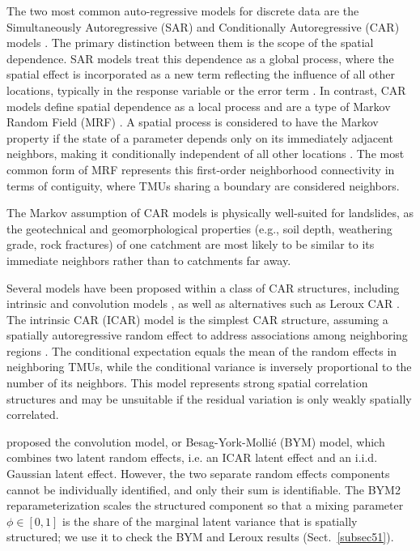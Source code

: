 \documentclass[journal abbreviation, manuscript]{copernicus}
\newcommand{\hlE}[1]{#1}
\begin{document}
The two most common auto-regressive models for discrete data are the Simultaneously Autoregressive (SAR) and Conditionally Autoregressive (CAR) models \citep{jaya2021spatial}. The primary distinction between them is the scope of the spatial dependence. SAR models treat this dependence as a global process, where the spatial effect is incorporated as a new term reflecting the influence of all other locations, typically in the response variable or the error term \citep{hooten2014simultaneous, anselin1988spatial}. In contrast, CAR models define spatial dependence as a local process and are a type of Markov Random Field (MRF) \citep{earnest2007evaluating, besag1991bayesian}. A spatial process is considered to have the Markov property if the state of a parameter depends only on its immediately adjacent neighbors, making it conditionally independent of all other locations \citep{clifford1990markov, rue2005gaussian}. The most common form of MRF represents this first-order neighborhood connectivity in terms of contiguity, where TMUs sharing a boundary are considered neighbors.

The Markov assumption of CAR models is physically well-suited for landslides, as the geotechnical and geomorphological properties (e.g., soil depth, weathering grade, rock fractures) of one catchment are most likely to be similar to its immediate neighbors rather than to catchments far away.

Several models have been proposed within a class of CAR structures, including intrinsic and convolution models \citep{besag1991bayesian}, as well as alternatives such as Leroux CAR \citep{leroux2000estimation}. The intrinsic CAR (ICAR) model is the simplest CAR structure, assuming a spatially autoregressive random effect to address associations among neighboring regions \citep{besag1991bayesian}. The conditional expectation equals the mean of the random effects in neighboring TMUs, while the conditional variance is inversely proportional to the number of its neighbors. This model represents strong spatial correlation structures and may be unsuitable \hlE{if the residual variation is only weakly spatially correlated}.

\citet{besag1991bayesian} proposed the convolution model, or Besag-York-Molli\'{e} (BYM) model, which combines two latent random effects, i.e. an ICAR latent effect and an i.i.d. Gaussian latent effect. However, the two separate random effects components cannot be individually identified, and only their sum is identifiable. \hlE{The BYM2 reparameterization }\citep{riebler2016intuitive}\hlE{ scales the structured component so that a mixing parameter $\phi \in [0,1]$ is the share of the marginal latent variance that is spatially structured; we use it to check the BYM and Leroux results (\mbox{Sect.~\ref{subsec51}}).}
\end{document}

